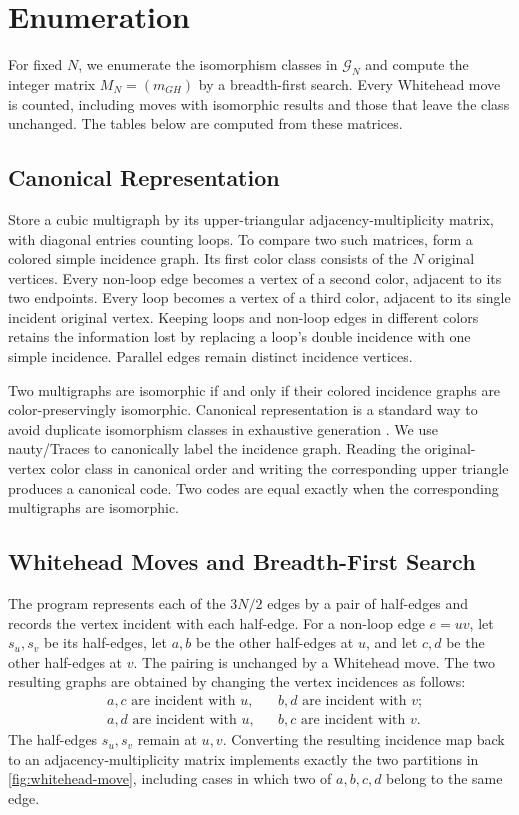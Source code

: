 \documentclass[11pt]{article}
\newcommand{\C}{\mathcal G}
\theoremstyle{plain}
\theoremstyle{definition}
\numberwithin{equation}{section}
\begin{document}
\section{Enumeration}\label{sec:enumeration}

For fixed $N$, we enumerate the isomorphism classes in $\C_N$ and compute
the integer matrix $M_N=(m_{GH})$ by a breadth-first search.  Every Whitehead
move is counted, including moves with isomorphic results and those that leave
the class unchanged.  The tables below are computed from these matrices.

\subsection{Canonical Representation}

Store a cubic multigraph by its upper-triangular adjacency-multiplicity
matrix, with diagonal entries counting loops.  To compare two such matrices,
form a colored simple incidence graph.  Its first color class consists of
the $N$ original vertices.  Every non-loop edge becomes a vertex of a
second color, adjacent to its two endpoints.  Every loop becomes a
vertex of a third color, adjacent to its single incident original vertex.
Keeping loops and non-loop edges in different colors retains the
information lost by replacing a loop's double incidence with one simple
incidence.
Parallel edges remain distinct incidence vertices.

Two multigraphs are isomorphic if and only if their colored incidence graphs
are color-preservingly isomorphic.  Canonical representation is a standard
way to avoid duplicate isomorphism classes in exhaustive generation
\cite{McKay1998}.  We use nauty/Traces \cite{McKayPiperno2014} to canonically
label the incidence graph.  Reading the original-vertex color class in
canonical order and writing the corresponding upper triangle produces a
canonical code.  Two codes are equal exactly when the corresponding
multigraphs are isomorphic.

\subsection{Whitehead Moves and Breadth-First Search}

The program represents each of the $3N/2$ edges by a pair of half-edges
and records the vertex incident with each half-edge.  For a non-loop edge
$e=uv$, let $s_u,s_v$ be its half-edges, let $a,b$ be the other half-edges
at $u$, and let $c,d$ be the other half-edges at $v$.  The pairing is
unchanged by a Whitehead move.  The two resulting graphs are obtained by
changing the vertex incidences as follows:
\begin{align*}
 &a,c\text{ are incident with }u,
 &&b,d\text{ are incident with }v;\\
 &a,d\text{ are incident with }u,
 &&b,c\text{ are incident with }v.
\end{align*}
The half-edges $s_u,s_v$ remain at $u,v$.  Converting the resulting incidence map
back to an adjacency-multiplicity matrix implements exactly the two
partitions in \cref{fig:whitehead-move}, including cases in which two of
$a,b,c,d$ belong to the same edge.
\end{document}
